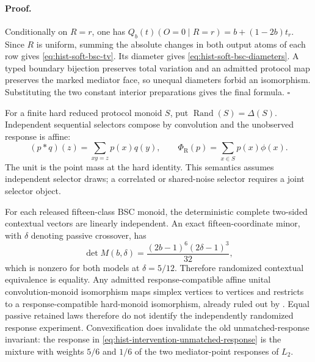 \paragraph{Proof.}
Conditionally on \(R=r\), one has
\(Q_b(t)(O=0\mid R=r)=b+(1-2b)t_r\).  Since \(R\) is uniform, summing the
absolute changes in both output atoms of each row gives
\eqref{eq:hist-soft-bsc-tv}.  Its diameter gives
\eqref{eq:hist-soft-bsc-diameters}.  A typed boundary bijection preserves
total variation and an admitted protocol map preserves the marked mediator
face, so unequal diameters forbid an isomorphism.  Substituting the two
constant interior preparations gives the final formula.  \(\square\)

For a finite hard reduced protocol monoid \(S\), put
\(\operatorname{Rand}(S)=\Delta(S)\).  Independent sequential selectors
compose by convolution and the unobserved response is affine:
\begin{equation}
(p*q)(z)=\sum_{xy=z}p(x)q(y),
\qquad
\Phi_{\mathrm R}(p)=\sum_{x\in S}p(x)\phi(x).
\label{eq:hist-affine-randomized-convolution}
\end{equation}
The unit is the point mass at the hard identity.  This semantics assumes
independent selector draws; a correlated or shared-noise selector requires a
joint selector object.  

For each released fifteen-class BSC monoid, the deterministic complete
two-sided contextual vectors are linearly independent.  An exact
fifteen-coordinate minor, with \(\delta\) denoting passive crossover, has
\begin{equation}
\det M(b,\delta)
=\frac{(2b-1)^6(2\delta-1)^3}{32},
\label{eq:hist-randomized-contextual-minor}
\end{equation}
which is nonzero for both models at \(\delta=5/12\).  Therefore randomized
contextual equivalence is equality.  Any admitted response-compatible affine
unital convolution-monoid isomorphism maps simplex vertices to vertices and
restricts to a response-compatible hard-monoid isomorphism, already ruled out
by .  Equal
passive retained laws therefore do not identify the independently randomized response
experiment.  Convexification does invalidate the old unmatched-response
invariant: the response in \eqref{eq:hist-intervention-unmatched-response} is
the mixture with weights \(5/6\) and \(1/6\) of the two mediator-point
responses of \(L_2\).  

